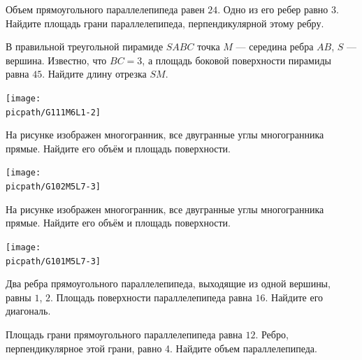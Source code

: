 \begin{homework}[number=1]
	\begin{listofex}
		\item Объем прямоугольного параллелепипеда равен \(24\). Одно из его ребер равно \(3\). Найдите площадь грани параллелепипеда, перпендикулярной этому ребру.
		\item 
		\begin{minipage}[t]{\bodywidth}
			В правильной треугольной пирамиде \(SABC\) точка \(M\) --- середина ребра \(AB\), \(S\) --- вершина. Известно, что \(BC = 3\), а площадь боковой поверхности пирамиды равна \(45\). Найдите длину отрезка \(SM\).
		\end{minipage}
		\hspace{0.02\linewidth}
		\begin{minipage}[t]{\picwidth}
			\texttt{[image: \\picpath/G111M6L1-2]}
		\end{minipage}
		\item 
		\begin{minipage}[t]{\bodywidth}
			На рисунке изображен многогранник, все двугранные углы многогранника прямые. Найдите его объём и площадь поверхности.
		\end{minipage}
		\hspace{0.02\linewidth}
		\begin{minipage}[t]{\picwidth}
			\texttt{[image: \\picpath/G102M5L7-3]}
		\end{minipage}
		\item 
		\begin{minipage}[t]{\bodywidth}
			На рисунке изображен многогранник, все двугранные углы многогранника прямые. Найдите его объём и площадь поверхности.
		\end{minipage}
		\hspace{0.02\linewidth}
		\begin{minipage}[t]{\picwidth}
			\texttt{[image: \\picpath/G101M5L7-3]}
		\end{minipage}
		\item Два ребра прямоугольного параллелепипеда, выходящие из одной вершины, равны \( 1 \), \( 2 \). Площадь поверхности параллелепипеда равна \( 16 \). Найдите его диагональ.
		\item Площадь грани прямоугольного параллелепипеда равна \( 12 \). Ребро, перпендикулярное этой грани, равно 4. Найдите объем параллелепипеда.

\end{listofex}
\end{homework}
